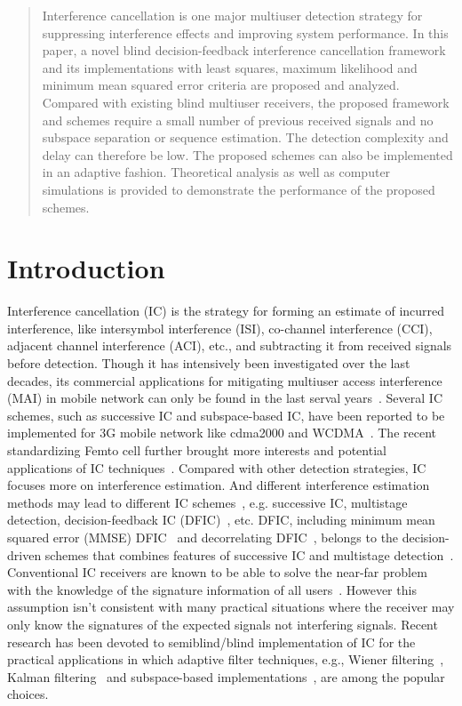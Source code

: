 \documentclass[conference]{IEEEtran}
\begin{document}

\maketitle
\begin{abstract}\small
Interference cancellation is one major multiuser detection
strategy for suppressing interference effects and improving system
performance. In this paper, a novel blind decision-feedback
interference cancellation framework and its implementations with
least squares, maximum likelihood and minimum mean squared error
criteria are proposed and analyzed. Compared with existing blind
multiuser receivers, the proposed framework and schemes require a
small number of previous received signals and no subspace
separation or sequence estimation. The detection complexity and
delay can therefore be low. The proposed schemes can also be
implemented in an adaptive fashion. Theoretical analysis as well
as computer simulations is provided to demonstrate the performance
of the proposed schemes.
\end{abstract}
\section{Introduction}
Interference cancellation (IC) is the strategy for forming an
estimate of incurred interference, like intersymbol interference
(ISI), co-channel interference (CCI), adjacent channel
interference (ACI), etc., and subtracting it from received signals
before detection. Though it has intensively been investigated over
the last decades, its commercial applications for mitigating
multiuser access interference (MAI) in mobile network can only be
found in the last serval years~\cite{Andr05}. Several IC schemes,
such as successive IC and subspace-based IC, have been reported to
be implemented for 3G mobile network like cdma2000 and
WCDMA~\cite{Wang06A}. The recent standardizing Femto cell further
brought more interests and potential applications of IC
techniques~\cite{Air07}. Compared with other detection strategies,
IC focuses more on interference estimation. And different
interference estimation methods may lead to different IC
schemes~\cite{Verd98,Wang02b}, e.g. successive IC, multistage
detection, decision-feedback IC (DFIC)~\cite{Kave85,Duel95}, etc.
DFIC, including minimum mean squared error (MMSE)
DFIC~\cite{Kave85} and decorrelating DFIC~\cite{Duel95}, belongs
to the decision-driven schemes that combines features of
successive IC and multistage detection~\cite{Verd98}. Conventional
IC receivers are known to be able to solve the near-far problem
with the knowledge of the signature information of all
users~\cite{Verd98}. However this assumption isn't consistent with
many practical situations where the receiver may only know the
signatures of the expected signals not interfering signals. Recent
research has been devoted to semiblind/blind implementation of IC
for the practical applications in which adaptive filter
techniques, e.g., Wiener filtering~\cite{Madh94}, Kalman
filtering~\cite{Zhang02} and subspace-based
implementations~\cite{Wang98}, are among the popular choices.
\end{document}
